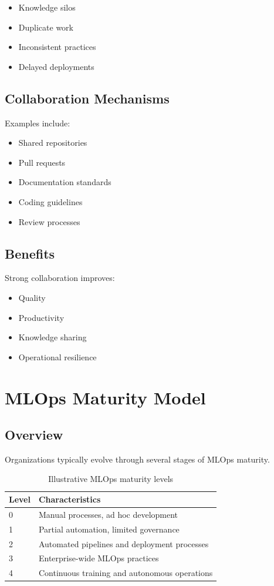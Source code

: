 \begin{itemize}
    \item Knowledge silos
    \item Duplicate work
    \item Inconsistent practices
    \item Delayed deployments
\end{itemize}

\subsection{Collaboration Mechanisms}

Examples include:

\begin{itemize}
    \item Shared repositories
    \item Pull requests
    \item Documentation standards
    \item Coding guidelines
    \item Review processes
\end{itemize}

\subsection{Benefits}

Strong collaboration improves:

\begin{itemize}
    \item Quality
    \item Productivity
    \item Knowledge sharing
    \item Operational resilience
\end{itemize}

\section{MLOps Maturity Model}

\subsection{Overview}

Organizations typically evolve through several stages of MLOps maturity.

\begin{table}[h]
\centering
\begin{tabular}{p{2cm}p{10cm}}
\toprule
Level & Characteristics \\
\midrule
0 & Manual processes, ad hoc development \\
1 & Partial automation, limited governance \\
2 & Automated pipelines and deployment processes \\
3 & Enterprise-wide MLOps practices \\
4 & Continuous training and autonomous operations \\
\bottomrule
\end{tabular}
\caption{Illustrative MLOps maturity levels}
\end{table}


